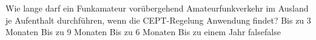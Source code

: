     {Wie lange darf ein Funkamateur vorübergehend Amateurfunkverkehr im Ausland je Aufenthalt durchführen, wenn die CEPT-Regelung Anwendung findet?}
    {Bis zu 3 Monaten}
    {Bis zu 9 Monaten}
    {Bis zu 6 Monaten}
    {Bis zu einem Jahr}
    {false}{false}